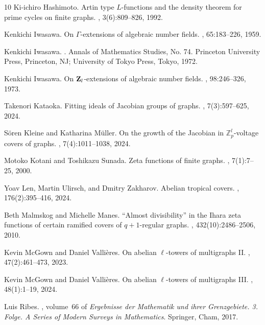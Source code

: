 \documentclass[11pt]{amsart}
\numberwithin{equation}{section}
\theoremstyle{remark}
\theoremstyle{definition}
\begin{document}
\begin{thebibliography}{10}
Ki-ichiro Hashimoto.
\newblock Artin type {$L$}-functions and the density theorem for prime cycles on finite graphs.
, 3(6):809--826, 1992.

Kenkichi Iwasawa.
\newblock On {$\Gamma $}-extensions of algebraic number fields.
, 65:183--226, 1959.

Kenkichi Iwasawa.
.
\newblock Annals of Mathematics Studies, No. 74. Princeton University Press, Princeton, NJ; University of Tokyo Press, Tokyo, 1972.

Kenkichi Iwasawa.
\newblock On {${\bf Z}_{l}$}-extensions of algebraic number fields.
, 98:246--326, 1973.

Takenori Kataoka.
\newblock Fitting ideals of {J}acobian groups of graphs.
, 7(3):597--625, 2024.

S\"{o}ren Kleine and Katharina M\"{u}ller.
\newblock On the growth of the {J}acobian in {$\mathbb{Z}_{p}^{l}$}-voltage covers of graphs.
, 7(4):1011--1038, 2024.

Motoko Kotani and Toshikazu Sunada.
\newblock Zeta functions of finite graphs.
, 7(1):7--25, 2000.

Yoav Len, Martin Ulirsch, and Dmitry Zakharov.
\newblock Abelian tropical covers.
, 176(2):395--416, 2024.

Beth Malmskog and Michelle Manes.
\newblock ``{A}lmost divisibility'' in the {I}hara zeta functions of certain ramified covers of {$q+1$}-regular graphs.
, 432(10):2486--2506, 2010.

Kevin McGown and Daniel Valli\`eres.
\newblock On abelian {$\ell$}-towers of multigraphs {II}.
, 47(2):461--473, 2023.

Kevin McGown and Daniel Valli\`eres.
\newblock On abelian {$\ell$}-towers of multigraphs {III}.
, 48(1):1--19, 2024.

Luis Ribes.
, volume~66 of {\em Ergebnisse der Mathematik und ihrer Grenzgebiete. 3. Folge. A Series of Modern Surveys in Mathematics}.
\newblock Springer, Cham, 2017.


\end{thebibliography}
\end{document}
